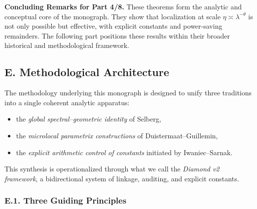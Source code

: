 \medskip

\noindent\textbf{Concluding Remarks for Part 4/8.}
These theorems form the analytic and conceptual core of the monograph.
They show that localization at scale $\eta\asymp\lambda^{-\theta}$
is not only possible but effective,
with explicit constants and power-saving remainders.
The following part positions these results within their broader
historical and methodological framework.


\subsection*{E. Methodological Architecture}
\label{sub:intro-methodology}

The methodology underlying this monograph is designed to unify three traditions
into a single coherent analytic apparatus:
\begin{itemize}
  \item the \emph{global spectral–geometric identity} of Selberg,
  \item the \emph{microlocal parametrix constructions} of Duistermaat–Guillemin,
  \item the \emph{explicit arithmetic control of constants} initiated by Iwaniec–Sarnak.
\end{itemize}
This synthesis is operationalized through what we call the \emph{Diamond v2 framework},
a bidirectional system of linkage, auditing, and explicit constants.

\subsubsection*{E.1. Three Guiding Principles}

